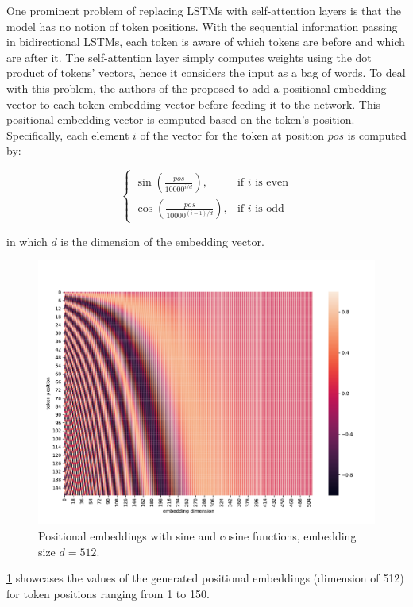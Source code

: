 One prominent problem of replacing LSTMs with self-attention layers is that the model has no notion of token positions.
With the sequential information passing in bidirectional LSTMs, each token is aware of which tokens are before and which are after it.
The self-attention layer simply computes weights using the dot product of tokens' vectors, hence it considers the input as a bag of words.
To deal with this problem, the authors of the \transformer proposed to add a positional embedding vector to each token embedding vector before feeding it to the network.
This positional embedding vector is computed based on the token's position. Specifically, each element $i$ of the vector for the token at position $pos$ is computed by:

\[\begin{cases} \sin\left(\frac{pos}{10000^{i/d}}\right), & \mbox{if } i\mbox{ is even} \\ \cos\left(\frac{pos}{10000^{(i-1)/d}}\right), & \mbox{if } i\mbox{ is odd} \end{cases}\]

in which $d$ is the dimension of the embedding vector.

\begin{figure}
    \centering
    \includegraphics[width=\linewidth]{img/positional-embedding.pdf}
    \caption{Positional embeddings with sine and cosine functions, embedding size $d=512$.}
    \label{fig:positional-embedding}
\end{figure}

\cref{fig:positional-embedding} showcases the values of the generated positional embeddings (dimension of 512) for token positions ranging from 1 to 150.


